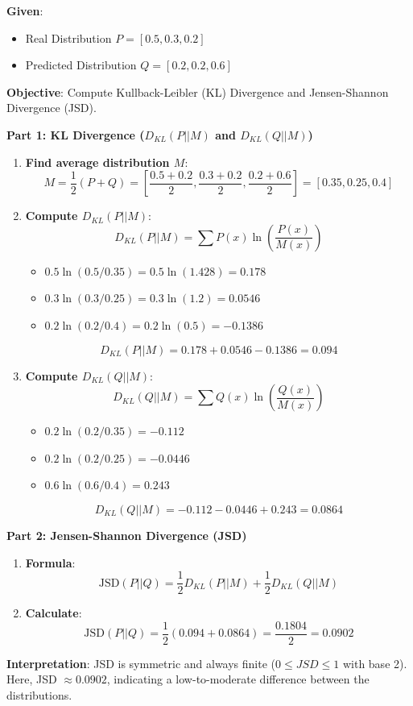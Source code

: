 \documentclass[11pt,a4paper]{article}
\begin{document}
\begin{tcolorbox}[colback=blue!5!white,colframe=blue!75!black,title=\textbf{Worked Example 13: KL and JS Divergence}]
\textbf{Given}:
\begin{itemize}
    \item Real Distribution $P = [0.5, 0.3, 0.2]$
    \item Predicted Distribution $Q = [0.2, 0.2, 0.6]$
\end{itemize}

\textbf{Objective}: Compute Kullback-Leibler (KL) Divergence and Jensen-Shannon Divergence (JSD).

\textbf{Part 1: KL Divergence ($D_{KL}(P || M)$ and $D_{KL}(Q || M)$)}
\begin{enumerate}
    \item \textbf{Find average distribution $M$}:
    \[ M = \frac{1}{2}(P + Q) = \left[ \frac{0.5+0.2}{2}, \frac{0.3+0.2}{2}, \frac{0.2+0.6}{2} \right] = [0.35, 0.25, 0.4] \]
    \item \textbf{Compute $D_{KL}(P || M)$}:
    \[ D_{KL}(P || M) = \sum P(x) \ln\left(\frac{P(x)}{M(x)}\right) \]
    \begin{itemize}
        \item $0.5 \ln(0.5 / 0.35) = 0.5 \ln(1.428) = 0.178$
        \item $0.3 \ln(0.3 / 0.25) = 0.3 \ln(1.2) = 0.0546$
        \item $0.2 \ln(0.2 / 0.4) = 0.2 \ln(0.5) = -0.1386$
    \end{itemize}
    \[ D_{KL}(P || M) = 0.178 + 0.0546 - 0.1386 = 0.094 \]
    \item \textbf{Compute $D_{KL}(Q || M)$}:
    \[ D_{KL}(Q || M) = \sum Q(x) \ln\left(\frac{Q(x)}{M(x)}\right) \]
    \begin{itemize}
        \item $0.2 \ln(0.2 / 0.35) = -0.112$
        \item $0.2 \ln(0.2 / 0.25) = -0.0446$
        \item $0.6 \ln(0.6 / 0.4) = 0.243$
    \end{itemize}
    \[ D_{KL}(Q || M) = -0.112 - 0.0446 + 0.243 = 0.0864 \]
\end{enumerate}

\textbf{Part 2: Jensen-Shannon Divergence (JSD)}
\begin{enumerate}
    \item \textbf{Formula}:
    \[ \text{JSD}(P || Q) = \frac{1}{2} D_{KL}(P || M) + \frac{1}{2} D_{KL}(Q || M) \]
    \item \textbf{Calculate}:
    \[ \text{JSD}(P || Q) = \frac{1}{2} (0.094 + 0.0864) = \frac{0.1804}{2} = 0.0902 \]
\end{enumerate}
\textbf{Interpretation}: JSD is symmetric and always finite ($0 \le JSD \le 1$ with base 2). Here, JSD $\approx 0.0902$, indicating a low-to-moderate difference between the distributions.
\end{tcolorbox}
\end{document}
